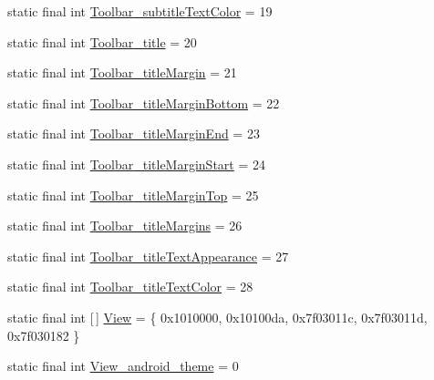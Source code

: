 \begin{DoxyCompactItemize}
\item 
static final int \mbox{\hyperlink{classandroid_1_1support_1_1v7_1_1appcompat_1_1_r_1_1styleable_a7adbd084daa46b375e6d08a318eaea52}{Toolbar\+\_\+subtitle\+Text\+Color}} = 19
\item 
static final int \mbox{\hyperlink{classandroid_1_1support_1_1v7_1_1appcompat_1_1_r_1_1styleable_a56aef9ae7056ca1c293e056fb1da40c3}{Toolbar\+\_\+title}} = 20
\item 
static final int \mbox{\hyperlink{classandroid_1_1support_1_1v7_1_1appcompat_1_1_r_1_1styleable_a14e9f0213b518aca69cde7d8a2bf4205}{Toolbar\+\_\+title\+Margin}} = 21
\item 
static final int \mbox{\hyperlink{classandroid_1_1support_1_1v7_1_1appcompat_1_1_r_1_1styleable_a0550c95fd1ad266727fc9d98e677235e}{Toolbar\+\_\+title\+Margin\+Bottom}} = 22
\item 
static final int \mbox{\hyperlink{classandroid_1_1support_1_1v7_1_1appcompat_1_1_r_1_1styleable_a5af2f9d4fdf6f945d2340b5b9fa4f04c}{Toolbar\+\_\+title\+Margin\+End}} = 23
\item 
static final int \mbox{\hyperlink{classandroid_1_1support_1_1v7_1_1appcompat_1_1_r_1_1styleable_a7c416ae3b5c0071a240e5f8135f2c12f}{Toolbar\+\_\+title\+Margin\+Start}} = 24
\item 
static final int \mbox{\hyperlink{classandroid_1_1support_1_1v7_1_1appcompat_1_1_r_1_1styleable_aa4a73cce7755d27d8dd9266d6b2af22e}{Toolbar\+\_\+title\+Margin\+Top}} = 25
\item 
static final int \mbox{\hyperlink{classandroid_1_1support_1_1v7_1_1appcompat_1_1_r_1_1styleable_a12bc46ef3a7e84c54f1605a360569247}{Toolbar\+\_\+title\+Margins}} = 26
\item 
static final int \mbox{\hyperlink{classandroid_1_1support_1_1v7_1_1appcompat_1_1_r_1_1styleable_a0cb9adf45f180ac45768a0740adde323}{Toolbar\+\_\+title\+Text\+Appearance}} = 27
\item 
static final int \mbox{\hyperlink{classandroid_1_1support_1_1v7_1_1appcompat_1_1_r_1_1styleable_ae4d6d3b0232dc582346e59fe0075c161}{Toolbar\+\_\+title\+Text\+Color}} = 28
\item 
static final int \mbox{[}$\,$\mbox{]} \mbox{\hyperlink{classandroid_1_1support_1_1v7_1_1appcompat_1_1_r_1_1styleable_a0105bc03f2606ae1fc5f05a515d81b3c}{View}} = \{ 0x1010000, 0x10100da, 0x7f03011c, 0x7f03011d, 0x7f030182 \}
\item 
static final int \mbox{\hyperlink{classandroid_1_1support_1_1v7_1_1appcompat_1_1_r_1_1styleable_a97295033e07fbae4ddf3760f36497583}{View\+\_\+android\+\_\+theme}} = 0

\end{DoxyCompactItemize}
